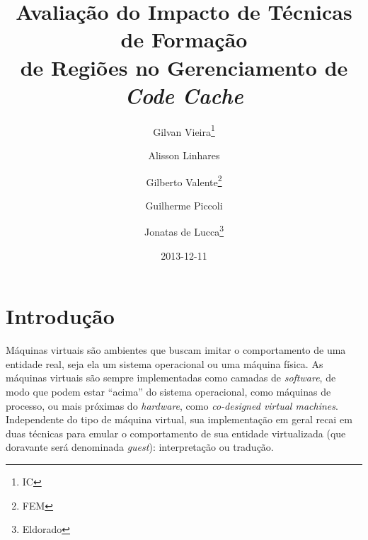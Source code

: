 \documentclass[12pt,twoside]{article}
\newcommand{\guest}{\emph{guest}}
\newcommand{\qq}[1]{``#1''}
\begin{document}
% 

%



\TRMakeCover

%
\pagestyle{myheadings}

%
\title{Avaliação do Impacto de Técnicas de Formação\\ de Regiões no Gerenciamento de \emph{Code Cache}}

\author{Gilvan Vieira\thanks{IC} \and
Alisson Linhares\footnotemark[1] \and Gilberto Valente\thanks{FEM} \and Guilherme Piccoli\footnotemark[1] \and Jonatas de Lucca\thanks{Eldorado}}

\date{2013-12-11}

\maketitle



%
%  


\section{Introdução}
Máquinas virtuais são ambientes que buscam imitar o comportamento de uma entidade real, seja ela um sistema operacional ou uma máquina física. As máquinas virtuais são sempre implementadas como camadas de \emph{software}, de modo que podem estar \qq{acima} do sistema operacional, como máquinas de processo, ou mais próximas do \emph{hardware}, como \emph{co-designed virtual machines}. Independente do tipo de máquina virtual, sua implementação em geral recai em duas técnicas para emular o comportamento de sua entidade virtualizada (que doravante será denominada \guest): interpretação ou tradução. 
\end{document}
